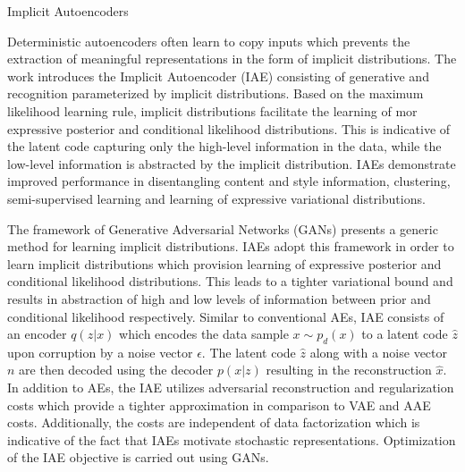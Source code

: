 \documentclass[11pt,letterpaper]{article}
\begin{document}
\begin{center}
  \large{Implicit Autoencoders}
\end{center}

Deterministic autoencoders often learn to copy inputs which prevents the extraction of meaningful representations in the form of implicit distributions. The work introduces the Implicit Autoencoder (IAE) consisting of generative and recognition parameterized by implicit distributions. Based on the maximum likelihood learning rule, implicit distributions facilitate the learning of mor expressive posterior and conditional likelihood distributions. This is indicative of the latent code capturing only the high-level information in the data, while the low-level information is abstracted by the implicit distribution. IAEs demonstrate improved performance in disentangling content and style information, clustering, semi-supervised learning and learning of expressive variational distributions. 

The framework of Generative Adversarial Networks (GANs) presents a generic method for learning implicit distributions. IAEs adopt this framework in order to learn implicit distributions which provision learning of expressive posterior and conditional likelihood distributions. This leads to a tighter variational bound and results in abstraction of high and low levels of information between prior and conditional likelihood respectively. Similar to conventional AEs, IAE consists of an encoder $q(z|x)$ which encodes the data sample $x \sim p_{d}(x)$ to a latent code $\hat{z}$ upon corruption by a noise vector $\epsilon$. The latent code $\hat{z}$ along with a noise vector $n$ are then decoded using the decoder $p(x|z)$ resulting in the reconstruction $\hat{x}$. In addition to AEs, the IAE utilizes adversarial reconstruction and regularization costs which provide a tighter approximation in comparison to VAE and AAE costs. Additionally, the costs are independent of data factorization which is indicative of the fact that IAEs motivate stochastic representations. Optimization of the IAE objective is carried out using GANs. 
\end{document}
